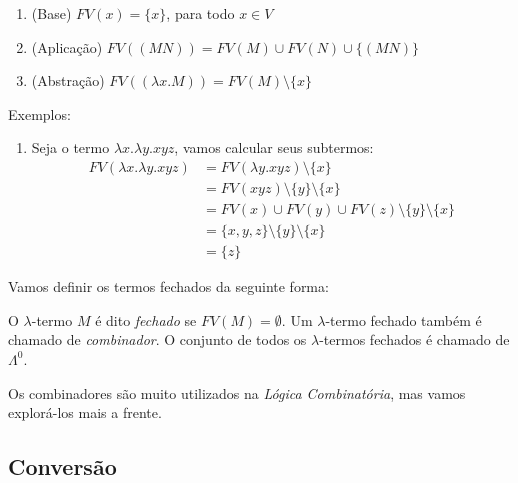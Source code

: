 \documentclass[../main.tex]{subfiles}
\begin{document}
\begin{definition}
    \hfill
    \begin{enumerate}
        \item (Base) $FV(x) = \{x\}$, para todo $x \in V$
        \item (Aplicação) $FV((M N)) = FV(M) \cup FV(N) \cup \{ (M N) \}$
        \item (Abstração) $FV((\lambda x . M)) = FV(M) \setminus \{x\}$
    \end{enumerate}

\end{definition}

Exemplos:

\begin{enumerate}
    \item Seja o termo $\lambda x . \lambda y . xyz$, vamos calcular seus subtermos:
    \begin{equation*}
        \begin{split}
            FV(\lambda x . \lambda y . xyz) & = FV(\lambda y . xyz) \setminus \{x\} 
                                         \\ & = FV(xyz) \setminus \{y\} \setminus \{x\}
                                         \\ & = FV(x) \cup FV(y) \cup FV(z) \setminus \{y\}  \setminus \{x\} 
                                         \\ & = \{x, y, z\} \setminus \{y\}  \setminus \{x\}
                                         \\ & = \{z\}
        \end{split}
    \end{equation*}
\end{enumerate}

Vamos definir os termos fechados da seguinte forma:

\begin{definition}
    O $\lambda$-termo $M$ é dito \emph{fechado} se $FV(M) = \emptyset$. Um $\lambda$-termo fechado também é chamado de \emph{combinador}. O conjunto de todos os $\lambda$-termos fechados é chamado de $\Lambda^0$.
\end{definition}

Os combinadores são muito utilizados na \emph{Lógica Combinatória}, mas vamos explorá-los mais a frente.

\subsection{Conversão}
\end{document}
